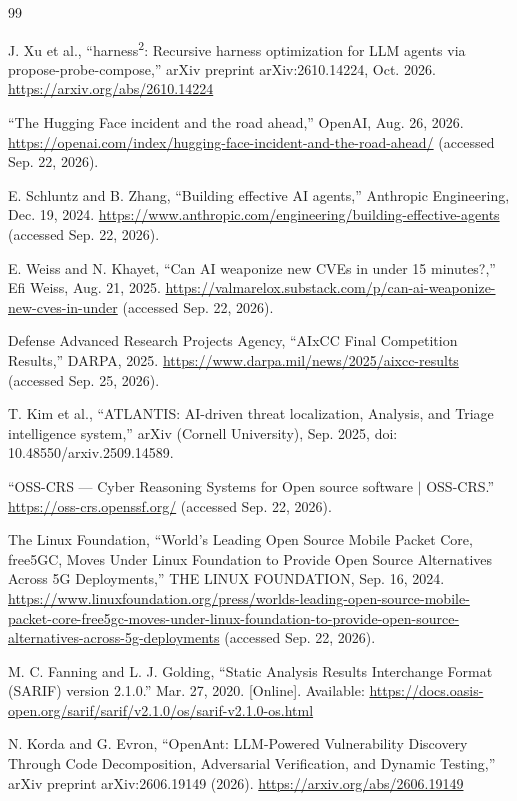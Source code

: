 \documentclass[12pt,a4paper]{report}
\begin{document}
\begin{thebibliography}{99}

 J. Xu et al., ``harness\textsuperscript{2}: Recursive harness optimization for LLM agents via propose-probe-compose,'' arXiv preprint arXiv:2610.14224, Oct. 2026. \url{https://arxiv.org/abs/2610.14224}

 ``The Hugging Face incident and the road ahead,'' OpenAI, Aug. 26, 2026. \url{https://openai.com/index/hugging-face-incident-and-the-road-ahead/} (accessed Sep. 22, 2026).

 E. Schluntz and B. Zhang, ``Building effective AI agents,'' Anthropic Engineering, Dec. 19, 2024. \url{https://www.anthropic.com/engineering/building-effective-agents} (accessed Sep. 22, 2026).

 E. Weiss and N. Khayet, ``Can AI weaponize new CVEs in under 15 minutes?,'' Efi Weiss, Aug. 21, 2025. \url{https://valmarelox.substack.com/p/can-ai-weaponize-new-cves-in-under} (accessed Sep. 22, 2026).

 Defense Advanced Research Projects Agency, ``AIxCC Final Competition Results,'' DARPA, 2025. \url{https://www.darpa.mil/news/2025/aixcc-results} (accessed Sep. 25, 2026).

 T. Kim et al., ``ATLANTIS: AI-driven threat localization, Analysis, and Triage intelligence system,'' arXiv (Cornell University), Sep. 2025, doi: 10.48550/arxiv.2509.14589.

 ``OSS-CRS --- Cyber Reasoning Systems for Open source software $\vert$ OSS-CRS.'' \url{https://oss-crs.openssf.org/} (accessed Sep. 22, 2026).

 The Linux Foundation, ``World's Leading Open Source Mobile Packet Core, free5GC, Moves Under Linux Foundation to Provide Open Source Alternatives Across 5G Deployments,'' THE LINUX FOUNDATION, Sep. 16, 2024. \url{https://www.linuxfoundation.org/press/worlds-leading-open-source-mobile-packet-core-free5gc-moves-under-linux-foundation-to-provide-open-source-alternatives-across-5g-deployments} (accessed Sep. 22, 2026).

 M. C. Fanning and L. J. Golding, ``Static Analysis Results Interchange Format (SARIF) version 2.1.0.'' Mar. 27, 2020. [Online]. Available: \url{https://docs.oasis-open.org/sarif/sarif/v2.1.0/os/sarif-v2.1.0-os.html}

 N. Korda and G. Evron, ``OpenAnt: LLM-Powered Vulnerability Discovery Through Code Decomposition, Adversarial Verification, and Dynamic Testing,'' arXiv preprint arXiv:2606.19149 (2026). \url{https://arxiv.org/abs/2606.19149}


\end{thebibliography}
\end{document}
